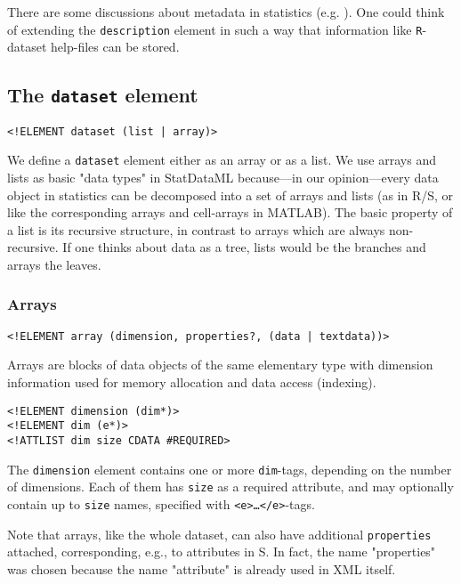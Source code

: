 \documentclass[a4paper]{article}
\begin{document}
There are some discussions about metadata in statistics (e.g. 
 ).
One could think of extending the \texttt{description} element in such a way
that information like \texttt{R}-dataset help-files can be stored.  

\subsection{The \texttt{dataset} element}

\begin{verbatim}
<!ELEMENT dataset (list | array)>
\end{verbatim}

We define a \texttt{dataset} element either as an array or as a list.
We use arrays and lists as basic "data types" in StatDataML
because---in our opinion---every data object
in statistics can be decomposed into a set of arrays and lists (as
in R/S, or like the corresponding arrays and cell-arrays in MATLAB).  The
basic property of a list is its recursive structure, in contrast to
arrays which are always non-recursive. If one thinks about data as a
tree, lists would be the branches and arrays the leaves.

\subsubsection{Arrays}

\begin{verbatim}
<!ELEMENT array (dimension, properties?, (data | textdata))>
\end{verbatim}

Arrays are blocks of data objects of the same elementary type
with dimension information used for memory allocation and data access
(indexing).  

\begin{verbatim}
<!ELEMENT dimension (dim*)>
<!ELEMENT dim (e*)>
<!ATTLIST dim size CDATA #REQUIRED>
\end{verbatim}

The \texttt{dimension} element contains one or more
\texttt{dim}-tags, depending on the number of dimensions. Each of
them has \texttt{size} as a required attribute, and may optionally
contain up to \texttt{size} names, specified with \texttt{<e>\ldots</e>}-tags.

Note that arrays, like the whole dataset, can also have additional
\texttt{properties} attached, corresponding, e.g., to attributes in
S. In fact, the name "properties" was chosen
because the name "attribute" is already used in XML itself. 
\end{document}
